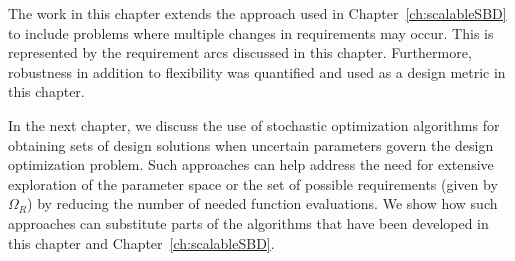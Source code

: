 The work in this chapter extends the approach used in Chapter~\ref{ch:scalableSBD} to include problems where multiple changes in requirements may occur. This is represented by the requirement arcs discussed in this chapter. Furthermore, robustness in addition to flexibility was quantified and used as a design metric in this chapter.

In the next chapter, we discuss the use of stochastic optimization algorithms for obtaining sets of design solutions when uncertain parameters govern the design optimization problem. Such approaches can help address the need for extensive exploration of the parameter space or the set of possible requirements (given by $\Omega_R$) by reducing the number of needed function evaluations. We show how such approaches can substitute parts of the algorithms that have been developed in this chapter and Chapter~\ref{ch:scalableSBD}.